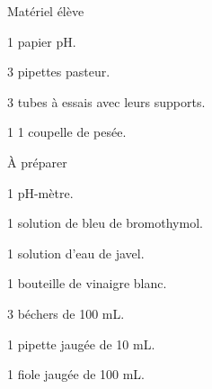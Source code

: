 
\begin{boiteMateriel}{Matériel élève}
  \effectifPremiereStss
  \begin{protocole}[2]
    \item 1 papier pH.
    \item 3 pipettes pasteur.
    \item 3 tubes à essais avec leurs supports.
    \item 1 1 coupelle de pesée.
  \end{protocole}
\end{boiteMateriel}


\begin{boiteMateriel}{À préparer}
  \phantom{b}
  \begin{protocole}[2]
    \item 1 pH-mètre.
    \item 1 solution de bleu de bromothymol.
    \item 1 solution d'eau de javel.
    \item 1 bouteille de vinaigre blanc.
    \item 3 béchers de 100 mL.
    \item 1 pipette jaugée de 10 mL.
    \item 1 fiole jaugée de 100 mL.
    \item[\vspace{\fill}]
  \end{protocole}
\end{boiteMateriel}